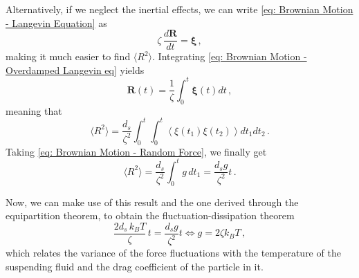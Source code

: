 \documentclass[../../main.tex]{subfiles}
\begin{document}
    Alternatively, if we neglect the inertial effects, we can write \cref{eq: Brownian Motion - Langevin Equation} as
        \begin{equation}\label{eq: Brownian Motion - Overdamped Langevin eq}
            \zeta\, \frac{d\mathbf{R}}{dt} = \bm{\xi} \,,
        \end{equation}
    making it much easier to find $\langle R^2 \rangle$. Integrating \cref{eq: Brownian Motion - Overdamped Langevin eq} yields
        \begin{equation}
            \mathbf{R}(t) = \frac{1}{\zeta}\int_{0}^{t} \bm{\xi}(t)dt \,,
        \end{equation}
    meaning that
        \begin{equation}\label{eq: Browninan Motion - Position Correlation}
            \langle R^2 \rangle = \frac{d_s}{\zeta^2} \int_{0}^{t}\int_{0}^{t} \left\langle \xi(t_1)\xi(t_2) \right\rangle dt_1 dt_2  \,.
        \end{equation}
    Taking \cref{eq: Brownian Motion - Random Force}, we finally get
        \begin{equation}
            \langle R^2 \rangle = \frac{d_s}{\zeta^2}\int_{0}^{t} g\,dt_1 = \frac{d_s g}{\zeta^2}t \,.
        \end{equation}
    
    Now, we can make use of this result and the one derived through the equipartition theorem, to obtain the fluctuation-dissipation theorem
        \begin{equation}\label{eq: g}
            \frac{2d_s\, k_B T}{\zeta}\, t = \frac{d_s g}{\zeta^2}t \Leftrightarrow g=2\zeta k_B T \,,
        \end{equation}
    which relates the variance of the force fluctuations with the temperature of the suspending fluid and the drag coefficient of the particle in it.
    
\end{document}
